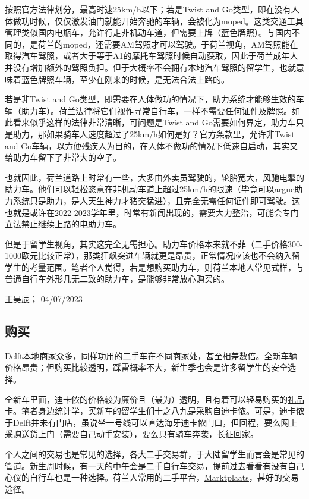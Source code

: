 按照官方法律划分，最高时速25km/h以下；若是Twist and Go类型，即在没有人体做功时候，仅仅激发油门就能开始奔驰的车辆，会被化为moped。这类交通工具管理类似国内电瓶车，允许行走非机动车道，但需要上牌（蓝色牌照）。与国内不同的，是荷兰的moped，还需要AM驾照才可以驾驶。于荷兰视角，AM驾照能在取得汽车驾照，或者大于等于A1的摩托车驾照时候自动获取，因此于荷兰成年人并没有增加额外的驾照负担。但于大概率不会拥有本地汽车驾照的留学生，也就意味着蓝色牌照车辆，至少在刚来的时候，是无法合法上路的。

若是非Twist and Go类型，即需要在人体做功的情况下，助力系统才能够生效的车辆（助力车）。荷兰法律将它们视作寻常自行车，一样不需要任何证件及牌照。如此看来似乎这样的法律非常清晰，可问题是Twist and Go需要如何界定，助力车只是助力，那如果骑车人速度超过了25km/h如何是好？官方条款里，允许非Twist and Go车辆，以方便残疾人为目的，在人体不做功的情况下低速自启动，其实又给助力车留下了非常大的空子。

也就因此，荷兰道路上时常有一些，大多由外卖员驾驶的，轮胎宽大，风驰电掣的助力车。他们可以轻松恣意在非机动车道上超过25km/h的限速（毕竟可以argue助力系统只是助力，是人天生神力才猪突猛进），且完全无需任何证件即可驾驶。这也就是或许在2022-2023学年里，时常有新闻出现的，需要大力整治，可能会专门立法禁止继续上路的电助力车。

但是于留学生视角，其实这完全无需担心。助力车价格本来就不菲（二手价格300-1000欧元比较正常），那类狂飙突进车辆就更是昂贵，正常情况应该也不会纳入留学生的考量范围。笔者个人觉得，若是想购买助力车，则荷兰本地人常见式样，与普通自行车外形几无二致的助力车，是能够非常放心购买的。
\begin{flushright}
王昊辰； 04/07/2023
\end{flushright}

\subsection{购买}
Delft本地商家众多，同样功用的二手车在不同商家处，甚至相差数倍。全新车辆价格昂贵；但购买比较透明，踩雷概率不大，新生季也会是许多留学生的安全选择。

全新车里面，迪卡侬的价格较为廉价且（最为）透明，且有着可以轻易购买的\hyperlink{礼品卡}{\uline{礼品卡}}。笔者身边统计学，买新车的留学生们十之八九是采购自迪卡侬。可是，迪卡侬于Delft并未有门店，虽说坐一号线可以直达海牙迪卡侬门口，但回程，要么网上采购送货上门（需要自己动手安装），要么只有骑车奔袭，长征回家。

个人之间的交易也是常见的选择，各大二手交易群，于大陆留学生而言会是常见的管道。新生周时候，有一天的中午会是二手自行车交易，提前过去看看有没有自己心仪的自行车也是一种选择。荷兰人常用的二手平台，\href{https://www.marktplaats.nl/}{\uline{Marktplaats}}，甚好的交易途径。

